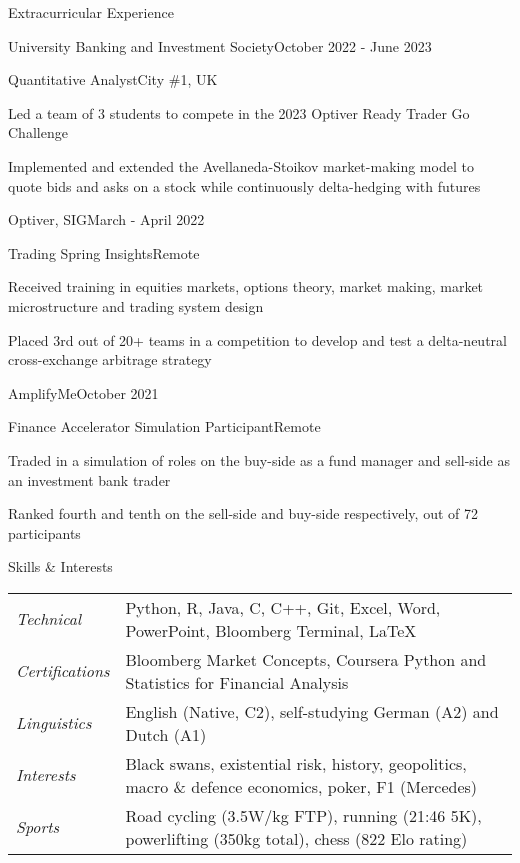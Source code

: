 \documentclass[10pt,a4paper]{CV}
\begin{document}
\begin{Section}{Extracurricular Experience}
    \begin{Institution}{University Banking and Investment Society}{October 2022 - June 2023}
        \begin{Position}{Quantitative Analyst}{City \#1, UK}
            \item Led a team of 3 students to compete in the 2023 Optiver Ready Trader Go Challenge
            \item Implemented and extended the Avellaneda-Stoikov market-making model to quote bids and asks on a stock while continuously delta-hedging with futures
        \end{Position}
    \end{Institution}
    
    \begin{Institution}{Optiver, SIG}{March - April 2022}
        \begin{Position}{Trading Spring Insights}{Remote}
            \item Received training in equities markets, options theory, market making, market microstructure and trading system design
            \item Placed 3rd out of 20+ teams in a competition to develop and test a delta-neutral cross-exchange arbitrage strategy
        \end{Position}
    \end{Institution}

    \begin{Institution}{AmplifyMe}{October 2021}
        \begin{Position}{Finance Accelerator Simulation Participant}{Remote}
            \item Traded in a simulation of roles on the buy-side as a fund manager and sell-side as an investment bank trader
            \item Ranked fourth and tenth on the sell-side and buy-side respectively, out of 72 participants
        \end{Position}
    \end{Institution}
\end{Section}

\begin{Section}{Skills \& Interests}
    \begin{tabular}{@{} >{\itshape}l @{\hspace{5mm}} l @{}}
        Technical & Python, R, Java, C, C++, Git, Excel, Word, PowerPoint,         Bloomberg Terminal, \LaTeX \\
	Certifications & Bloomberg Market Concepts, Coursera Python and Statistics for Financial Analysis \\
	Linguistics & English (Native, C2), self-studying German (A2) and Dutch (A1) \\
	Interests & Black swans, existential risk, history, geopolitics, macro \& defence economics, poker, F1 (Mercedes) \\
        Sports & Road cycling (3.5W/kg FTP), running (21:46 5K), powerlifting (350kg total), chess (822 Elo rating) \\
    \end{tabular}
\end{Section}
\end{document}

